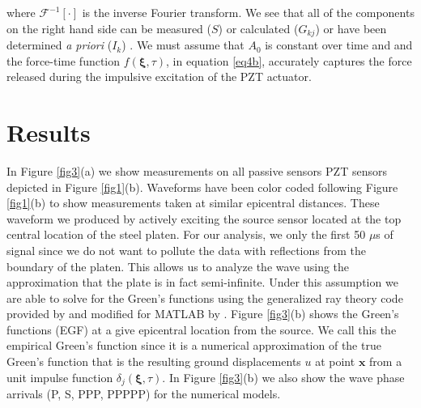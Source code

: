 \documentclass[preprint,3p, 11pt,authoryear]{elsarticle}
\begin{document}
{\noindent where $\mathcal{F}^{-1}[\cdot]$  is the inverse Fourier transform. We see that all of the components on the right hand side can be measured ($S$) or calculated ($G_{kj}$) or have been determined \textit{a priori} ($I_{k}$) . We must assume that $A_{0}$ is constant over time and and the force-time function $f(\mathbf{\xi}, \tau)$, in equation \eqref{eq4b}, accurately captures the force released during the impulsive excitation of the PZT actuator. 

\section{Results}
\label{results}

In Figure \ref{fig3}(a) we show measurements on all passive sensors PZT sensors depicted in Figure \ref{fig1}(b).  Waveforms have been color coded following Figure \ref{fig1}(b) to show measurements taken at similar epicentral distances. These waveform we produced by actively exciting the source sensor located at the top central location of the steel platen. For our analysis, we only the first 50 $\mu$s of signal since we do not want to pollute the data with reflections from the boundary of the platen.  This allows us to analyze the wave using the approximation that the plate is in fact semi-infinite. Under this assumption we are able to solve for the Green's functions using the generalized ray theory code provided by \citet{Hsu1985} and modified for MATLAB by \citet{McLaskey2012}.  Figure \ref{fig3}(b) shows the Green's functions (EGF) at a give epicentral location from the source. We call this the empirical Green's function since it is a numerical approximation of the true Green's function that is the resulting ground displacements $u$ at point $\mathbf{x}$ from a unit impulse function $\delta_{j}(\mathbf{\xi}, \tau)$. In Figure \ref{fig3}(b) we also show the wave phase arrivals (P, S, PPP, PPPPP) for the numerical models.

}
\end{document}

